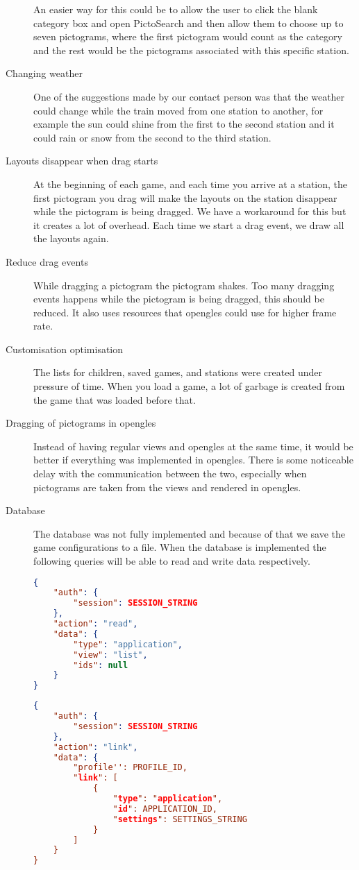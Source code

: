 \begin{description}
An easier way for this could be to allow the user to click the blank category box and open PictoSearch and then allow them to choose up to seven pictograms, where the first pictogram would count as the category and the rest would be the pictograms associated with this specific station.
\item[Changing weather] One of the suggestions made by our contact person was that the weather could change while the train moved from one station to another, for example the sun could shine from the first to the second station and it could rain or snow from the second to the third station. 
\item[Layouts disappear when drag starts] At the beginning of each game, and each time you arrive at a station, the first pictogram you drag will make the layouts on the station disappear while the pictogram is being dragged. We have a workaround for this but it creates a lot of overhead. Each time we start a drag event, we draw all the layouts again.
\item[Reduce drag events] While dragging a pictogram the pictogram shakes. Too many dragging events happens while the pictogram is being dragged, this should be reduced. It also uses resources that \ac{opengles} could use for higher frame rate.
\item[Customisation optimisation] The lists for children, saved games, and stations were created under pressure of time. When you load a game, a lot of garbage is created from the game that was loaded before that.
\item[Dragging of pictograms in \ac{opengles}] Instead of having regular views and \ac{opengles} at the same time, it would be better if everything was implemented in \ac{opengles}. There is some noticeable delay with the communication between the two, especially when pictograms are taken from the views and rendered in \ac{opengles}.
\item[Database] The database was not fully implemented and because of that we save the game configurations to a file. When the database is implemented the following queries will be able to read and write data respectively.
\begin{lstlisting}[language=json,firstnumber=1,caption={JSON query to read application data.},label=lst:jsonread]
{
    "auth": {
        "session": SESSION_STRING
    },
    "action": "read",
    "data": {
        "type": "application",
        "view": "list",
        "ids": null
    }
}
\end{lstlisting}

\begin{lstlisting}[language=json,firstnumber=1,caption={JSON query to write application data.},label=lst:jsonwrite]
{
    "auth": {
        "session": SESSION_STRING
    },
    "action": "link",
    "data": {
        "profile'': PROFILE_ID,
        "link": [
            {
                "type": "application",
                "id": APPLICATION_ID,
                "settings": SETTINGS_STRING
            }
        ]
    }
}
\end{lstlisting}
\end{description}

